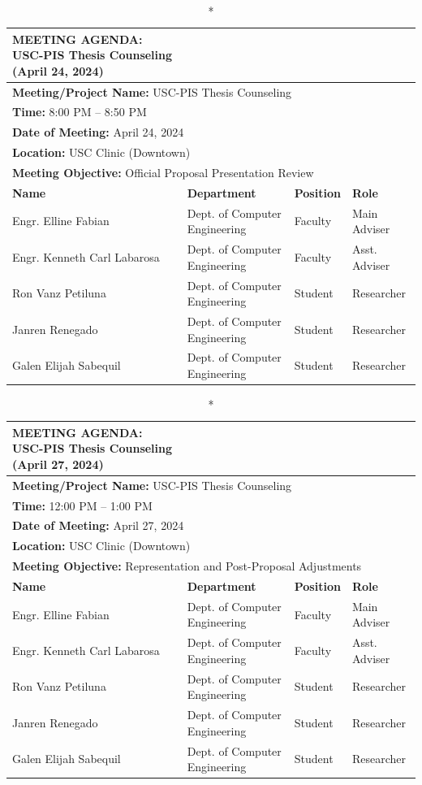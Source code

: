 \begin{longtable}{|p{4cm}|p{4cm}|p{3cm}|p{3cm}|}
\caption*{MEETING AGENDA: USC-PIS Thesis Counseling (April 24, 2024)} \\
\hline
\multicolumn{4}{|l|}{\textbf{Meeting/Project Name:} USC-PIS Thesis Counseling} \\
\multicolumn{4}{|l|}{\textbf{Time:} 8:00 PM – 8:50 PM} \\
\multicolumn{4}{|l|}{\textbf{Date of Meeting:} April 24, 2024} \\
\multicolumn{4}{|l|}{\textbf{Location:} USC Clinic (Downtown)} \\
\multicolumn{4}{|l|}{\textbf{Meeting Objective:} Official Proposal Presentation Review} \\
\hline
\textbf{Name} & \textbf{Department} & \textbf{Position} & \textbf{Role} \\
\hline
Engr. Elline Fabian & Dept. of Computer Engineering & Faculty & Main Adviser \\
\hline
Engr. Kenneth Carl Labarosa & Dept. of Computer Engineering & Faculty & Asst. Adviser \\
\hline
Ron Vanz Petiluna & Dept. of Computer Engineering & Student & Researcher \\
\hline
Janren Renegado & Dept. of Computer Engineering & Student & Researcher \\
\hline
Galen Elijah Sabequil & Dept. of Computer Engineering & Student & Researcher \\
\hline
\end{longtable}

\begin{longtable}{|p{4cm}|p{4cm}|p{3cm}|p{3cm}|}
\caption*{MEETING AGENDA: USC-PIS Thesis Counseling (April 27, 2024)} \\
\hline
\multicolumn{4}{|l|}{\textbf{Meeting/Project Name:} USC-PIS Thesis Counseling} \\
\multicolumn{4}{|l|}{\textbf{Time:} 12:00 PM – 1:00 PM} \\
\multicolumn{4}{|l|}{\textbf{Date of Meeting:} April 27, 2024} \\
\multicolumn{4}{|l|}{\textbf{Location:} USC Clinic (Downtown)} \\
\multicolumn{4}{|l|}{\textbf{Meeting Objective:} Representation and Post-Proposal Adjustments} \\
\hline
\textbf{Name} & \textbf{Department} & \textbf{Position} & \textbf{Role} \\
\hline
Engr. Elline Fabian & Dept. of Computer Engineering & Faculty & Main Adviser \\
\hline
Engr. Kenneth Carl Labarosa & Dept. of Computer Engineering & Faculty & Asst. Adviser \\
\hline
Ron Vanz Petiluna & Dept. of Computer Engineering & Student & Researcher \\
\hline
Janren Renegado & Dept. of Computer Engineering & Student & Researcher \\
\hline
Galen Elijah Sabequil & Dept. of Computer Engineering & Student & Researcher \\
\hline
\end{longtable}

